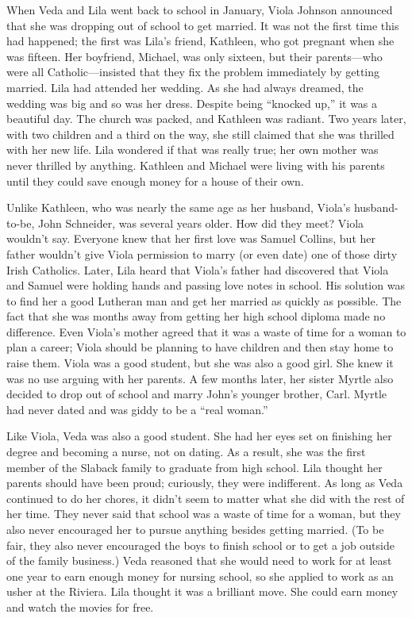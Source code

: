 \documentclass[
  letterpaper,
]{book}
\begin{document}
When Veda and Lila went back to school in January, Viola Johnson
announced that she was dropping out of school to get married. It was not
the first time this had happened; the first was Lila's friend, Kathleen,
who got pregnant when she was fifteen. Her boyfriend, Michael, was only
sixteen, but their parents---who were all Catholic---insisted that they
fix the problem immediately by getting married. Lila had attended her
wedding. As she had always dreamed, the wedding was big and so was her
dress. Despite being ``knocked up,'' it was a beautiful day. The church
was packed, and Kathleen was radiant. Two years later, with two children
and a third on the way, she still claimed that she was thrilled with her
new life. Lila wondered if that was really true; her own mother was
never thrilled by anything. Kathleen and Michael were living with his
parents until they could save enough money for a house of their own.

Unlike Kathleen, who was nearly the same age as her husband, Viola's
husband-to-be, John Schneider, was several years older. How did they
meet? Viola wouldn't say. Everyone knew that her first love was Samuel
Collins, but her father wouldn't give Viola permission to marry (or even
date) one of those dirty Irish Catholics. Later, Lila heard that Viola's
father had discovered that Viola and Samuel were holding hands and
passing love notes in school. His solution was to find her a good
Lutheran man and get her married as quickly as possible. The fact that
she was months away from getting her high school diploma made no
difference. Even Viola's mother agreed that it was a waste of time for a
woman to plan a career; Viola should be planning to have children and
then stay home to raise them. Viola was a good student, but she was also
a good girl. She knew it was no use arguing with her parents. A few
months later, her sister Myrtle also decided to drop out of school and
marry John's younger brother, Carl. Myrtle had never dated and was giddy
to be a ``real woman.''

Like Viola, Veda was also a good student. She had her eyes set on
finishing her degree and becoming a nurse, not on dating. As a result,
she was the first member of the Slaback family to graduate from high
school. Lila thought her parents should have been proud; curiously, they
were indifferent. As long as Veda continued to do her chores, it didn't
seem to matter what she did with the rest of her time. They never said
that school was a waste of time for a woman, but they also never
encouraged her to pursue anything besides getting married. (To be fair,
they also never encouraged the boys to finish school or to get a job
outside of the family business.) Veda reasoned that she would need to
work for at least one year to earn enough money for nursing school, so
she applied to work as an usher at the Riviera. Lila thought it was a
brilliant move. She could earn money and watch the movies for free.
\end{document}
